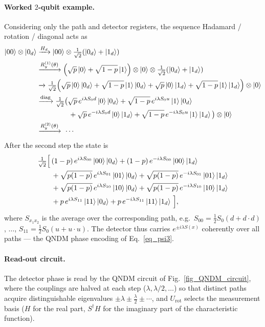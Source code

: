 \documentclass[11pt]{article}
\begin{document}
\paragraph{Worked $2$-qubit example.} Considering only the path and detector registers, the sequence Hadamard / rotation / diagonal acts as
\begin{align}
    \ket{00}\otimes\ket{0_d}
    &\xrightarrow{H_d}\ket{00}\otimes\tfrac{1}{\sqrt2}\qty(\ket{0_d}+\ket{1_d})\notag\\
    &\xrightarrow{R_y^{(1)}(\theta)}\qty(\sqrt{p}\ket{0}+\sqrt{1-p}\ket{1})\otimes\ket{0}\otimes\tfrac{1}{\sqrt2}\qty(\ket{0_d}+\ket{1_d})\notag\\
    &\xrightarrow{\ }\tfrac{1}{\sqrt2}\qty(\sqrt{p}\ket{0}\ket{0_d}+\sqrt{1-p}\ket{1}\ket{0_d}+\sqrt{p}\ket{0}\ket{1_d}+\sqrt{1-p}\ket{1}\ket{1_d})\otimes\ket{0}\notag\\
    &\xrightarrow{\text{diag}}\tfrac{1}{\sqrt2}\big(\sqrt{p}\,e^{i\lambda S_0 d}\ket{0}\ket{0_d}+\sqrt{1-p}\,e^{i\lambda S_0 u}\ket{1}\ket{0_d}\notag\\
    &\hspace{1.6cm}+\sqrt{p}\,e^{-i\lambda S_0 d}\ket{0}\ket{1_d}+\sqrt{1-p}\,e^{-i\lambda S_0 u}\ket{1}\ket{1_d}\big)\otimes\ket{0}\notag\\
    &\xrightarrow{R_y^{(2)}(\theta)}\ \cdots
\end{align}
After the second step the state is
\begin{equation}
\begin{aligned}
\tfrac{1}{\sqrt2}\Big[\,
&(1-p)\,e^{i\lambda S_{00}}\ket{00}\ket{0_d}+(1-p)\,e^{-i\lambda S_{00}}\ket{00}\ket{1_d}\\
&+\sqrt{p(1-p)}\,e^{i\lambda S_{01}}\ket{01}\ket{0_d}+\sqrt{p(1-p)}\,e^{-i\lambda S_{01}}\ket{01}\ket{1_d}\\
&+\sqrt{p(1-p)}\,e^{i\lambda S_{10}}\ket{10}\ket{0_d}+\sqrt{p(1-p)}\,e^{-i\lambda S_{10}}\ket{10}\ket{1_d}\\
&+p\,e^{i\lambda S_{11}}\ket{11}\ket{0_d}+p\,e^{-i\lambda S_{11}}\ket{11}\ket{1_d}\,\Big],
\end{aligned}
\end{equation}
where $S_{x_1x_2}$ is the average over the corresponding path, e.g.\ $S_{00}=\tfrac12 S_0(d+d\cdot d)$, $\dots$, $S_{11}=\tfrac12 S_0(u+u\cdot u)$. The detector thus carries $e^{\pm i\lambda S(x)}$ coherently over all paths --- the QNDM phase encoding of Eq.~\eqref{eq_psi3}.

\paragraph{Read-out circuit.} The detector phase is read by the QNDM circuit of Fig.~\ref{fig_QNDM_circuit}, where the couplings are halved at each step ($\lambda,\lambda/2,\dots$) so that distinct paths acquire distinguishable eigenvalues $\pm\lambda\pm\tfrac\lambda2\pm\cdots$, and $U_{\text{rot}}$ selects the measurement basis ($H$ for the real part, $S^\dagger H$ for the imaginary part of the characteristic function).
\end{document}
